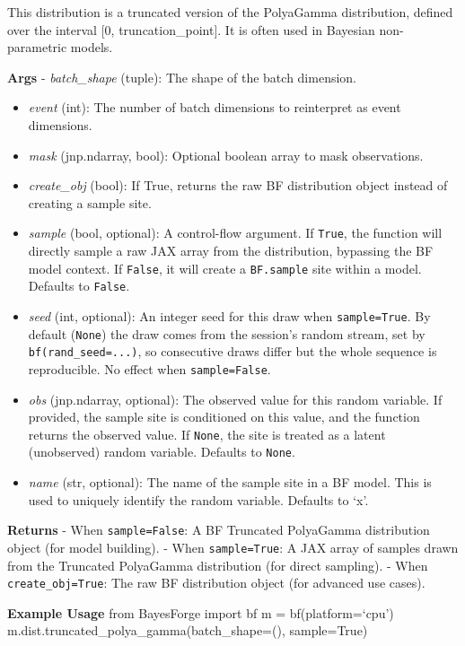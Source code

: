 \documentclass[
  letterpaper,
  DIV=11,
  numbers=noendperiod]{scrartcl}
\begin{document}
This distribution is a truncated version of the PolyaGamma distribution,
defined over the interval {[}0, truncation\_point{]}. It is often used
in Bayesian non-parametric models.

\textbf{Args} - \emph{batch\_shape} (tuple): The shape of the batch
dimension.

\begin{itemize}
\item
  \emph{event} (int): The number of batch dimensions to reinterpret as
  event dimensions.
\item
  \emph{mask} (jnp.ndarray, bool): Optional boolean array to mask
  observations.
\item
  \emph{create\_obj} (bool): If True, returns the raw BF distribution
  object instead of creating a sample site.
\item
  \emph{sample} (bool, optional): A control-flow argument. If
  \texttt{True}, the function will directly sample a raw JAX array from
  the distribution, bypassing the BF model context. If \texttt{False},
  it will create a \texttt{BF.sample} site within a model. Defaults to
  \texttt{False}.
\item
  \emph{seed} (int, optional): An integer seed for this draw when
  \texttt{sample=True}. By default (\texttt{None}) the draw comes from
  the session's random stream, set by \texttt{bf(rand\_seed=...)}, so
  consecutive draws differ but the whole sequence is reproducible. No
  effect when \texttt{sample=False}.
\item
  \emph{obs} (jnp.ndarray, optional): The observed value for this random
  variable. If provided, the sample site is conditioned on this value,
  and the function returns the observed value. If \texttt{None}, the
  site is treated as a latent (unobserved) random variable. Defaults to
  \texttt{None}.
\item
  \emph{name} (str, optional): The name of the sample site in a BF
  model. This is used to uniquely identify the random variable. Defaults
  to `x'.
\end{itemize}

\textbf{Returns} - When \texttt{sample=False}: A BF Truncated PolyaGamma
distribution object (for model building). - When \texttt{sample=True}: A
JAX array of samples drawn from the Truncated PolyaGamma distribution
(for direct sampling). - When \texttt{create\_obj=True}: The raw BF
distribution object (for advanced use cases).

\textbf{Example Usage} from BayesForge import bf m = bf(platform=`cpu')
m.dist.truncated\_polya\_gamma(batch\_shape=(), sample=True)
\end{document}
